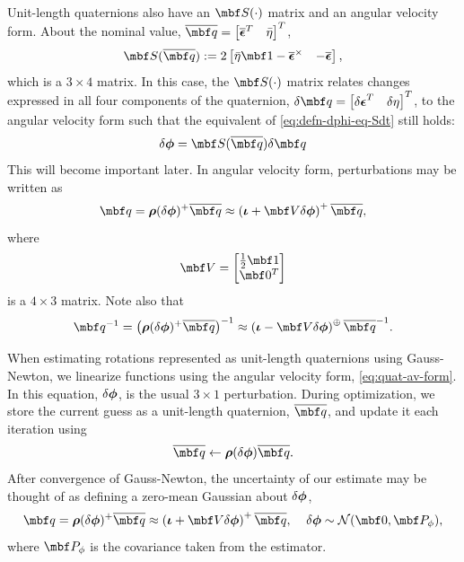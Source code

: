 \documentclass[11pt,a4,oneside]{article}
\begin{document}
Unit-length quaternions also have an $\mbf S(\cdot)$ matrix and an angular velocity form. About the nominal value, $\mbfbar q = \bbm \mbsbar \epsilon^T & \bar \eta \ebm^T$, 
\begin{equation}
  \label{eq:quat-S-matrix}
  \mbf S(\mbfbar q) := 
    2\bbm
       \bar \eta \mbf 1 - \mbsbar \epsilon^\times & -\mbsbar \epsilon
    \ebm,
\end{equation}
which is a $3 \times 4$ matrix. In this case, the $\mbf S(\cdot)$ matrix relates changes expressed in all four components of the quaternion, $\mbfdel q = \bbm \mbsdel \epsilon^T & \delta \eta \ebm^T$, to the angular velocity form such that the equivalent of \eqref{eq:defn-dphi-eq-Sdt} still holds: 
\begin{equation}
  \label{eq:quat-S}
  \mbsdel \phi = \mbf S(\mbfbar q) \mbfdel q
\end{equation}
This will become important later. In angular velocity form, perturbations may be written as
\begin{equation}
  \label{eq:quat-av-form}
  \mbf q = \mbs \rho(\mbsdel\phi)^{+}\mbfbar q \approx \left(\mbs \iota + \mbf V \mbsdel \phi \right)^{+}\mbfbar q,
\end{equation}
where
\begin{equation}
  \label{eq:def-V}
  \mbf V = \bbm \tfrac{1}{2} \mbf 1\\\mbf 0^T\ebm
\end{equation}
is a $4 \times 3$ matrix. Note also that
\begin{equation}
  \label{eq:inv-quat-av-form}
  \mbf q^{-1} = \left(\mbs \rho(\mbsdel\phi)^{+}\mbfbar q\right)^{-1} \approx \left(\mbs \iota - \mbf V \mbsdel \phi \right)^{\oplus}\mbfbar q^{-1}.
\end{equation}

When estimating rotations represented as unit-length quaternions using Gauss-Newton, we linearize functions using the angular velocity form, \eqref{eq:quat-av-form}. In this equation, ${\delta {\boldsymbol{\phi}}}$, is the usual $3 \times 1$ perturbation. During optimization, we store the current guess as a unit-length quaternion, $\mbfbar q$, and update it each iteration using
\begin{equation}
  \label{eq:update-quat}
  \mbfbar q \leftarrow \mbs \rho(\mbsdel \phi) \mbfbar q.
\end{equation}
After convergence of Gauss-Newton, the uncertainty of our estimate may be thought of as defining a zero-mean Gaussian about ${\delta {\boldsymbol{\phi}}}$,
\begin{equation}
  \label{eq:gaussian-av-form}
  \mbf q = \mbs \rho(\mbsdel \phi)^{+} \mbfbar q \approx \left(\mbs \iota + \mbf V \mbsdel \phi\right)^{+}\mbfbar q,\;\;\;\;\mbsdel \phi \sim \mathcal{N}(\mbf 0, \mbf P_{\phi}),
\end{equation}
where $\mbf P_{\phi}$ is the covariance taken from the estimator. 
\end{document}
